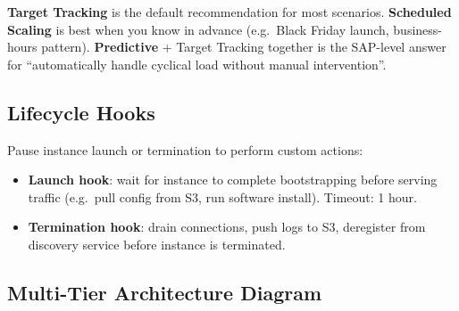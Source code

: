 \begin{examtip}
\textbf{Target Tracking} is the default recommendation for most scenarios.
\textbf{Scheduled Scaling} is best when you know in advance (e.g.\ Black Friday launch,
business-hours pattern). \textbf{Predictive} + Target Tracking together is the SAP-level
answer for ``automatically handle cyclical load without manual intervention''.
\end{examtip}

\subsection{Lifecycle Hooks}

Pause instance launch or termination to perform custom actions:
\begin{itemize}
  \item \textbf{Launch hook}: wait for instance to complete bootstrapping before serving traffic
        (e.g.\ pull config from S3, run software install). Timeout: 1 hour.
  \item \textbf{Termination hook}: drain connections, push logs to S3, deregister from
        discovery service before instance is terminated.
\end{itemize}

\subsection{Multi-Tier Architecture Diagram}

